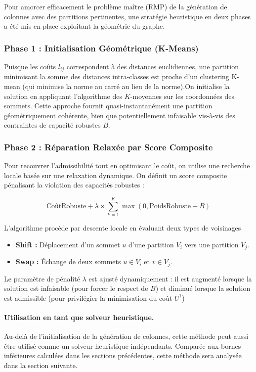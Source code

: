 \documentclass{article}
\begin{document}
Pour amorcer efficacement le problème maître (RMP) de la génération de colonnes avec des partitions pertinentes, une stratégie heuristique en deux phases a été mis en place exploitant la géométrie du graphe.

\subsubsection*{Phase 1 : Initialisation Géométrique (K-Means)}
Puisque les coûts $l_{ij}$ correspondent à des distances euclidiennes, une partition minimisant la somme des distances intra-classes est  proche d'un clustering K-mean (qui minimise la norme au carré au lieu de la norme).On initialise la solution en appliquant l'algorithme des $K$-moyennes sur les coordonnées des sommets. Cette approche fournit quasi-instantanément une partition géométriquement cohérente, bien que potentiellement infaisable vis-à-vis des contraintes de capacité robustes $B$.

\subsubsection*{Phase 2 : Réparation Relaxée par Score Composite}
Pour recouvrer l'admissibilité tout en optimisant le coût, on utilise une recherche locale basée sur une relaxation dynamique. On définit un score composite pénalisant la violation des capacités robustes :

$$ \text{CoûtRobuste} + \lambda \times \sum_{k=1}^K \max(0, \text{PoidsRobuste} - B) $$

L'algorithme procède par descente locale en évaluant deux types de voisinages
\begin{itemize}
    \item \textbf{Shift :} Déplacement d'un sommet $u$ d'une partition $V_i$ vers une partition $V_j$.
    \item \textbf{Swap :} Échange de deux sommets $u \in V_i$ et $v \in V_j$.
\end{itemize}

Le paramètre de pénalité $\lambda$ est ajusté dynamiquement : il est augmenté lorsque la solution est infaisable (pour forcer le respect de $B$) et diminué lorsque la solution est admissible (pour privilégier la minimisation du coût $U^1$)

\paragraph{Utilisation en tant que solveur heuristique.}
Au-delà de l'initialisation de la génération de colonnes, cette méthode peut aussi être utilisé comme un solveur heuristique indépendants. Comparée aux bornes inférieures  calculées dans les sections précédentes, cette méthode sera analysée dans la section suivante.
\end{document}
